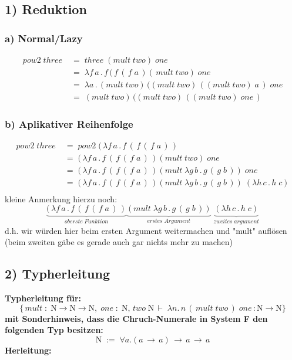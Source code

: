 \documentclass{article}
\begin{document}
	\subsection*{1) Reduktion}
	\subsubsection*{a) Normal/Lazy}
		\begin{align*}
			 pow2\;three\;	&=\;	three\;(mult\;two)\;one\\
			 				&=\;	\lambda f\,a\, .\,f\,(\,f\,(\,f\;a\,)(\,mult\;two)\;one\\
			 				&=\;	\lambda a\, .\, (mult\;two)\,((mult\;two)\,((mult\;two)\;a\,)\;one\\
			 				&=\;	(mult\;two)\,((mult\;two)\,((mult\;two)\;one\,)
		\end{align*}
	\subsubsection*{b) Aplikativer Reihenfolge}
		\begin{align*}
			pow2\;three\;	&=\;	pow2\; (\, \lambda f\,a\, .\,f\,(\,f\,(\,f\;a\,) \,)\\
							&=\;	(\, \lambda f\,a\, .\,f\,(\,f\,(\,f\;a\,) \,)(mult\;two)\;one\\
							&=\;	(\, \lambda f\,a\, .\,f\,(\,f\,(\,f\;a\,) \,)(mult\;\lambda g\,b\, .\,g\,(\,g\;b\,))\;one\\
							&=\;	(\, \lambda f\,a\, .\,f\,(\,f\,(\,f\;a\,) \,)(mult\;\lambda g\,b\, .\,g\,(\,g\;b\,))\;(\lambda h\,c\, .\,h\;c)\\
		\end{align*}
	kleine Anmerkung hierzu noch:
	\[
		\underbrace{(\, \lambda f\,a\, .\,f\,(\,f\,(\,f\;a\,) \,)}_{oberste\;Funktion}
		\underbrace{(mult\;\lambda g\,b\, .\,g\,(\,g\;b\,))}_{erstes\;Argument}
		\;
		\underbrace{(\lambda h\,c\, .\,h\;c)}_{zweites\;argument}
	\]
	d.h. wir w\"urden hier beim ersten Argument weitermachen und "mult" aufl\"osen
	(beim zweiten g\"abe es gerade auch gar nichts mehr zu machen)

	\subsection*{2) Typherleitung}	
		\textbf{Typherleitung f\"ur:}
		\[
			\{
			\,mult\;:\;
			\mathrm{N}\rightarrow\mathrm{N}\rightarrow\mathrm{N},\;
			one\; : \; \mathrm{N},\,two\;\mathrm{N}\,
			\vdash \; \lambda n.\,n\,(\, mult \; two\,)\;one\,:\mathrm{N}\rightarrow
			\mathrm{N}
			\}
		\]
		\textbf{mit Sonderhinweis, dass die Chruch-Numerale in System F den folgenden Typ besitzen:}
		\[
			\mathrm{N}\; := \; \forall a.(a\,\rightarrow \, a)\, \rightarrow \, a \, \rightarrow \,a		
		\]
	\textbf{Herleitung:}\\
		
\end{document}
